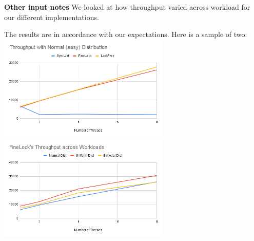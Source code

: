 \documentclass[11pt]{article}
\begin{document}


\textbf{Other input notes}
We looked at how throughput varied across workload for our different implementations. 

The results are in accordance with our expectations. Here is a sample of two: \\
\includegraphics[width=3.2in]{Throughput with Normal (easy) Distribution.png}
\includegraphics[width=3.2in]{FineLock's Throughput across Workloads.png}
\end{document}
